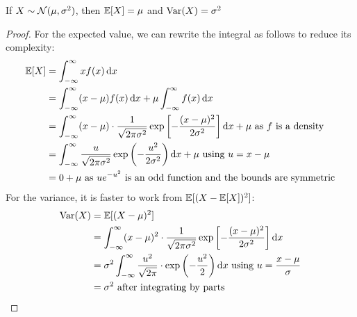 \documentclass[../main.tex]{subfiles}
\begin{document}
\begin{lemma}
  If $X \sim \operatorname{\mathcal{N}}(\mu, \sigma^2)$, then $\mathbb{E}[X] = \mu$ and $\operatorname{Var}(X) = \sigma^2$
\end{lemma}
\begin{proof}
  For the expected value, we can rewrite the integral as follows to reduce its complexity:
  \begin{align*}
    \E[X] &= \int_{-\infty}^{\infty} x f(x) \d{x} \\
          &= \int_{-\infty}^{\infty} (x - \mu)f(x) \d{x} + \mu \int_{-\infty}^{\infty} f(x) \d{x} \\
          &= \int_{-\infty}^{\infty} (x - \mu) \cdot \frac{1}{\sqrt{2 \pi \sigma^2}} \exp\left[-\frac{(x - \mu)^2}{2\sigma^2}\right] \d{x} + \mu \text{ as $f$ is a density} \\
          &= \int_{-\infty}^{\infty} \frac{u}{\sqrt{2 \pi \sigma^2}} \exp\left(-\frac{u^2}{2\sigma^2}\right) \d{x} + \mu  \text{ using $u = x- \mu$} \\
          &= 0 + \mu \text{ as $u e^{-u^2}$ is an odd function and the bounds are symmetric}
  \end{align*}
  For the variance, it is faster to work from $\mathbb{E}[(X - \mathbb{E}[X])^2]$:
  \begin{align*}
    \Var(X) &= \E[(X - \mu)^2] \\
            &= \int_{-\infty}^{\infty} (x - \mu)^2 \cdot \frac{1}{\sqrt{2 \pi \sigma^2}} \exp\left[-\frac{(x - \mu)^2}{2\sigma^2}\right]\d{x} \\
            &= \sigma^2 \int_{-\infty}^{\infty} \frac{u^2}{\sqrt{2\pi}}\cdot \exp\left(-\frac{u^2}{2}\right) \d{x} \text{ using $u = \frac{x - \mu}{\sigma}$} \\
            &= \sigma^2 \text{ after integrating by parts}
  \end{align*}
\end{proof}
\end{document}

